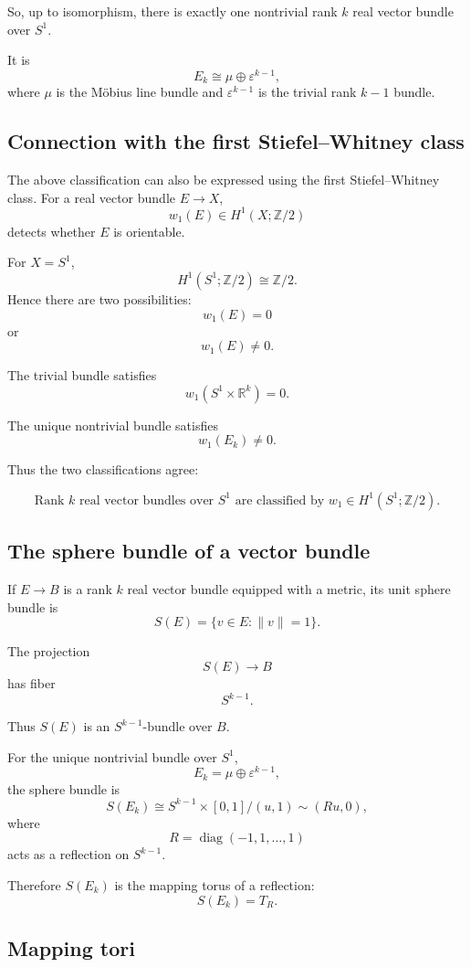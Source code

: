\documentclass[12pt,a4paper]{article}
\theoremstyle{notespace}
\begin{document}
So, up to isomorphism, there is exactly one nontrivial rank \(k\) real vector bundle over \(S^1\).

It is
\[
E_k\cong \mu\oplus \varepsilon^{k-1},
\]
where \(\mu\) is the Möbius line bundle and \(\varepsilon^{k-1}\) is the trivial rank \(k-1\) bundle.

\subsection{Connection with the first Stiefel--Whitney class}

The above classification can also be expressed using the first Stiefel--Whitney class. For a real vector bundle \(E\to X\),
\[
w_1(E)\in H^1(X;\mathbb{Z}/2)
\]
detects whether \(E\) is orientable.

For \(X=S^1\),
\[
H^1(S^1;\mathbb{Z}/2)\cong \mathbb{Z}/2.
\]
Hence there are two possibilities:
\[
w_1(E)=0
\]
or
\[
w_1(E)\neq 0.
\]

The trivial bundle satisfies
\[
w_1(S^1\times \mathbb{R}^k)=0.
\]

The unique nontrivial bundle satisfies
\[
w_1(E_k)\neq 0.
\]

Thus the two classifications agree:

\[
\boxed{
	\text{Rank }k\text{ real vector bundles over }S^1
	\text{ are classified by }w_1\in H^1(S^1;\mathbb{Z}/2).
}
\]

\subsection{The sphere bundle of a vector bundle}

If \(E\to B\) is a rank \(k\) real vector bundle equipped with a metric, its unit sphere bundle is
\[
S(E)=\{v\in E:\|v\|=1\}.
\]

The projection
\[
S(E)\to B
\]
has fiber
\[
S^{k-1}.
\]

Thus \(S(E)\) is an \(S^{k-1}\)-bundle over \(B\).

For the unique nontrivial bundle over \(S^1\),
\[
E_k=\mu\oplus \varepsilon^{k-1},
\]
the sphere bundle is
\[
S(E_k)
\cong
S^{k-1}\times [0,1]
\big/
(u,1)\sim (Ru,0),
\]
where
\[
R=\operatorname{diag}(-1,1,\dots,1)
\]
acts as a reflection on \(S^{k-1}\).

Therefore \(S(E_k)\) is the mapping torus of a reflection:
\[
S(E_k)=T_R.
\]

\subsection{Mapping tori}
\end{document}
